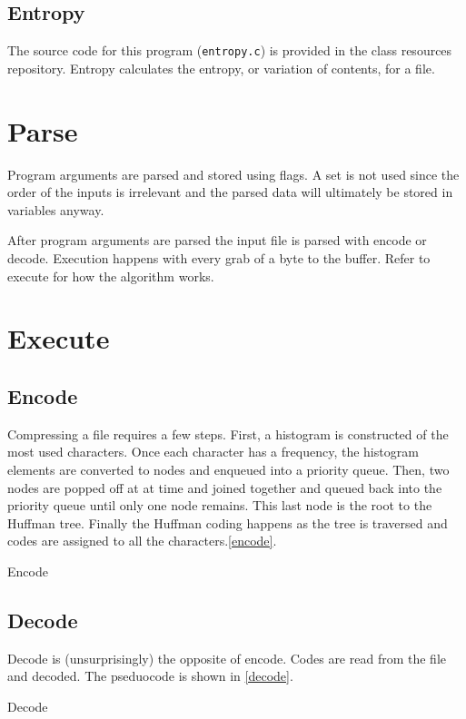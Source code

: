 \documentclass[12pt]{article}
\def\code#1{\texttt{#1}} %
\begin{document}
\subsection{Entropy}

The source code for this program (\code{entropy.c}) is provided in the class resources repository.
Entropy calculates the entropy, or variation of contents, for a file.

\section{Parse}

Program arguments are parsed and stored using flags.
A set is not used since the order of the inputs is irrelevant and the parsed data
will ultimately be stored in variables anyway.

After program arguments are parsed the input file is parsed with encode or decode.
Execution happens with every grab of a byte to the buffer.
Refer to execute for how the algorithm works.

\section{Execute}

\subsection{Encode}

Compressing a file requires a few steps. First, a histogram is constructed of the
most used characters. Once each character has a frequency, the histogram elements
are converted to nodes and enqueued into a priority queue. Then, two nodes are 
popped off at at time and joined together and queued back into the priority
queue until only one node remains. This last node is the root to the Huffman
tree. Finally the Huffman coding happens as the tree is traversed and codes
are assigned to all the characters.\vref{encode}.

\begin{algorithm}
    \caption{Encode}\label{encode}
\end{algorithm}

\subsection{Decode}

Decode is (unsurprisingly) the opposite of encode. Codes are read from the file
and decoded.
The pseduocode is shown in \vref{decode}.

\begin{algorithm}
    \caption{Decode}\label{decode}
\end{algorithm}
\end{document}
